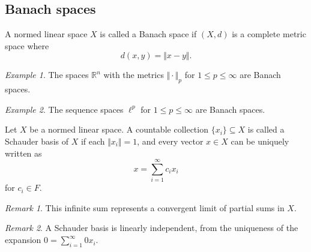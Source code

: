 \documentclass[11pt]{article}
\newcommand{\R}{\mathbb{R}}
\newcommand{\norm}[1]{\Vert #1 \Vert}
\theoremstyle{definition}
\theoremstyle{remark}
\newtheorem*{remark}{Remark}
\newtheorem*{example}{Example}
\begin{document}
    \subsection{Banach spaces}

    \begin{definition}
        A normed linear space $X$ is called a Banach space if $(X, d)$ is a complete
        metric space where \[
            d(x, y) = \norm{x - y}.
        \]
    \end{definition}
    \begin{example}
        The spaces $\R^n$ with the metrics $\norm{\cdot}_p$ for $1 \leq p \leq
        \infty$ are Banach spaces.
    \end{example}
    \begin{example}
        The sequence spaces $\ell^p$ for $1 \leq p \leq \infty$ are Banach spaces.
    \end{example}

    \begin{definition}
        Let $X$ be a normed linear space. A countable collection $\{x_i\} \subseteq
        X$ is called a Schauder basis of $X$ if each $\norm{x_i} = 1$, and every
        vector $x \in X$ can be uniquely written as \[
            x = \sum_{i = 1}^\infty c_ix_i
        \] for $c_i \in F$.
        \begin{remark}
            This infinite sum represents a convergent limit of partial sums in $X$.
        \end{remark}
        \begin{remark}
            A Schauder basis is linearly independent, from the uniqueness of the
            expansion $0 = \sum_{i = 1}^\infty 0x_i$.
        \end{remark}
    \end{definition}
\end{document}
